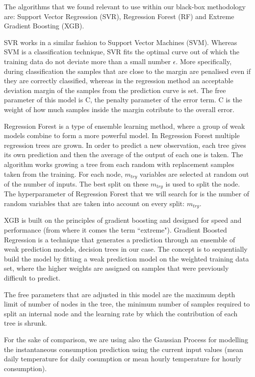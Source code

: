 \documentclass[10pt, conference, compsocconf]{IEEEtran}
\begin{document}
The algorithms that we found relevant to use within our black-box methodology are: Support Vector Regression (SVR), Regression Forest (RF) and Extreme Gradient Boosting (XGB). 

SVR works in a similar fashion to Support Vector Machines (SVM). Whereas SVM is a classification technique, SVR fits the optimal curve out of which the training data do not deviate more than a small number $\epsilon$. More specifically, during classification the samples that are close to the margin are penalised even if they are correctly classified, whereas in the regression method an acceptable deviation margin of the samples from the prediction curve is set.
The free parameter of this model is C, the penalty parameter of the error term. C is the weight of how much samples inside the margin cotribute to the overall error.%



Regression Forest is a type of ensemble learning method, where a group of weak models combine to form a more powerful model. In Regression Forest multiple regression trees are grown. In order to predict a new observation, each tree gives its own prediction and then the average of the output of each one is taken. The algorithm works growing a tree from each random with replacement samples taken from the training. For each node, $m_{try}$ variables are selected at random out of the number of inputs. The best split on these $m_{try}$ is used to split the node. The hyperparameter of Regression Forest that we will search for is the number of random variables that are taken into account on every split: $m_{try}$. 


XGB is built on the principles of gradient boosting and designed for speed and performance (from where it comes the term ``extreme").
Gradient Boosted Regression is a technique that generates a prediction through an ensemble of weak prediction models, decision trees in our case. The concept is to sequentially build the model by fitting a weak prediction model on the weighted training data set, where the higher weights are assigned on samples that were previously difficult to predict.

The free parameters that are adjusted in this model are the maximum depth limit of number of nodes in the tree, the minimum number of samples required to split an internal node and the learning rate by which the contribution of each tree is shrunk.

For the sake of comparison, we are using also the Gaussian Process for modelling the instantaneous consumption prediction using the current input values (mean daily temperature for daily cosumption or mean hourly temperature for hourly consumption).
\end{document}

